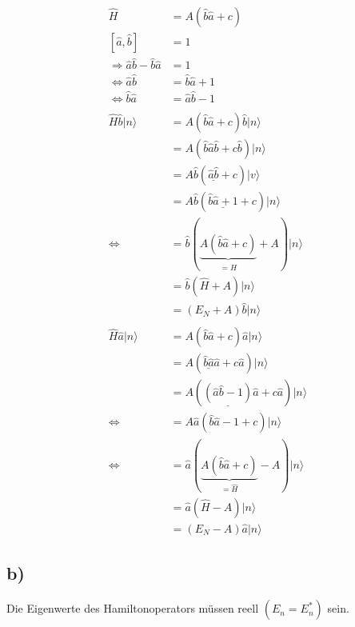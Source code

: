    \begin{align*}
        \hat{H} &= A\left( \hat{b}\hat{a} + c \right)\\
        \left[ \hat{a}, \hat{b} \right] &= 1\\
        \Rightarrow \hat{a}\hat{b} - \hat{b}\hat{a} &= 1\\
        \Leftrightarrow \hat{a}\hat{b} &= \hat{b}\hat{a} + 1\\
        \Leftrightarrow \hat{b}\hat{a} &= \hat{a}\hat{b} - 1\\
        \\
        \hat{H}\hat{b} \vert n \rangle &= A\left( \hat{b}\hat{a} +c \right)\hat{b} \vert n \rangle\\
        &= A\left(\hat{b}\hat{a}\hat{b}+c\hat{b} \right) \vert n \rangle\\
        &= A\hat{b} \left( \underline{\hat{a}\hat{b}} +c \right) \vert v \rangle\\
        &= A\hat{b} \left( \underline{\hat{b}\hat{a} + 1} + c \right) \vert n \rangle\\
        \Leftrightarrow &= \hat{b} \left(\underbrace{A\left(\hat{b}\hat{a}+c \right)}_{=\hat{H}} + A \right) \vert n \rangle\\
        &= \hat{b} \left( \hat{H} + A \right) \vert n \rangle\\
        &= \left( E_N + A \right) \hat{b} \vert n \rangle\\
        \\
        \hat{H}\hat{a} \vert n \rangle &= A\left( \hat{b}\hat{a} +c \right)\hat{a} \vert n \rangle\\ 
        &= A\left(\underline{\hat{b}\hat{a}}\hat{a}+c\hat{a} \right) \vert n \rangle\\
        &= A\left( \underline{\left( \hat{a}\hat{b}-1  \right)} \hat{a} + c\hat{a} \right)\vert n \rangle\\
        \Leftrightarrow &= A\hat{a} \left( \hat{b}\hat{a} - 1 + c \right) \vert n \rangle\\
        \Leftrightarrow &= \hat{a} \left(\underbrace{A\left(\hat{b}\hat{a}+c \right)}_{=\hat{H}} - A \right) \vert n \rangle\\
        &= \hat{a} \left( \hat{H} - A \right) \vert n \rangle\\
        &= \left( E_N - A \right) \hat{a} \vert n \rangle
    \end{align*}

    \subsection{b)}
    Die Eigenwerte des Hamiltonoperators müssen reell $(E_n=E_n^*)$ sein.

